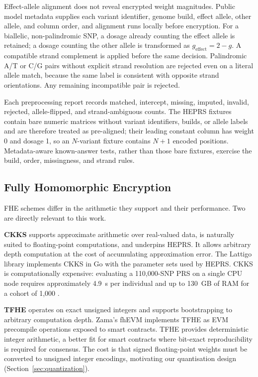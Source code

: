 \documentclass[10pt,twocolumn]{article}
\begin{document}
Effect-allele alignment does not reveal encrypted weight magnitudes.  Public model
metadata supplies each variant identifier, genome build, effect allele, other allele,
and column order, and alignment runs locally before encryption.  For a biallelic,
non-palindromic SNP, a dosage already counting the effect allele is retained; a dosage
counting the other allele is transformed as $g_{\mathrm{effect}}=2-g$.  A compatible
strand complement is applied before the same decision.  Palindromic A/T or C/G pairs
without explicit strand resolution are rejected even on a literal allele match, because
the same label is consistent with opposite strand orientations.  Any remaining
incompatible pair is rejected.

Each preprocessing report records matched, intercept, missing, imputed, invalid,
rejected, allele-flipped, and strand-ambiguous counts.  The HEPRS fixtures contain bare
numeric matrices without variant identifiers, builds, or allele labels and are therefore
treated as pre-aligned; their leading constant column has weight 0 and dosage 1, so an
$N$-variant fixture contains $N+1$ encoded positions.  Metadata-aware known-answer tests,
rather than those bare fixtures, exercise the build, order, missingness, and strand rules.

\subsection{Fully Homomorphic Encryption}

FHE schemes differ in the arithmetic they support and their performance.  Two are
directly relevant to this work.

\textbf{CKKS} \citep{cheon2017ckks} supports approximate arithmetic over real-valued data, is
naturally suited to floating-point computations, and underpins HEPRS.  It allows
arbitrary depth computation at the cost of accumulating approximation error.  The
Lattigo library \citep{lattigo} implements CKKS in Go with the parameter sets used
by HEPRS.  CKKS is computationally expensive: evaluating a 110,000-SNP PRS on a
single CPU node requires approximately 4.9~s per individual and up to 130~GB of RAM
for a cohort of 1,000 \citep{knight2026heprs}.

\textbf{TFHE} \citep{chillotti2020tfhe} operates on exact unsigned integers and
supports bootstrapping to arbitrary computation depth.  Zama's fhEVM implements TFHE
as EVM precompile operations exposed to smart contracts.  TFHE provides deterministic
integer arithmetic, a better fit for smart contracts where bit-exact reproducibility
is required for consensus. The cost is that signed floating-point weights must be
converted to unsigned integer encodings, motivating our quantisation design
(Section~\ref{sec:quantization}).
\end{document}
